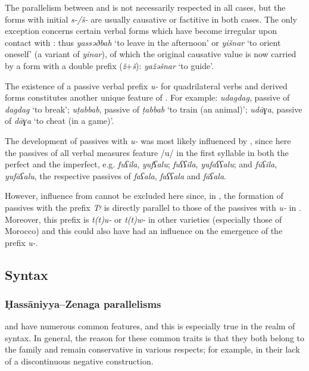 \documentclass[output=paper]{langsci/langscibook}
\begin{document}
The parallelism between  and  is not necessarily respected in all cases, but the forms with initial \textit{s-/š-} are usually {causative} or factitive in both cases. The only exception concerns certain  verbal forms which have become irregular upon contact with : thus \textit{yassəðbah} ‘to leave in the afternoon’ or \textit{yišnar} ‘to orient oneself’ (a variant of \textit{yinar}), of which the original {causative} value is now carried by a form with a double prefix (\textit{ž}+\textit{š}): \textit{yažəšnar} ‘to guide’.


The existence of a {passive} verbal prefix \textit{u-} for quadrilateral verbs and derived forms constitutes another unique feature of . For example: \textit{udagdag}, {passive} of \textit{dagdag} ‘to break’; \textit{uṭabbab}, {passive} of \textit{ṭabbab} ‘to train (an animal)’; \textit{udāɣa}, {passive} of \textit{dāɣa} ‘to cheat (in a game)’.

The development of passives with \textit{u-} was most likely influenced by  , since here the passives of all verbal measures feature /u/ in the first syllable in both the perfect and the imperfect, e.g. \textit{fuʕila}, \textit{yu}\textit{fʕalu}; \textit{fuʕʕila}, \textit{yu}\textit{faʕʕalu}; and \textit{fūʕila}, \textit{yu}\textit{fāʕalu}, the respective passives of \textit{faʕala}, \textit{faʕʕala} and \textit{fāʕala}.

However, influence from  cannot be excluded here since, in , the {formation} of passives with the prefix \textit{Tʸ} is directly parallel to those of the passives with \textit{u-} in . Moreover, this prefix is \textit{t(t)u-} or \textit{t(t)w-} in other  varieties (especially those of Morocco) and this could also have had an influence on the emergence of the prefix \textit{u-}. 

\subsection{Syntax} %

\subsubsection{Ḥassāniyya–Zenaga parallelisms} %

 and  have numerous common features, and this is especially true in the realm of syntax. In general, the reason for these common traits is that they both belong to the  family and remain conservative in various respects; for example, in their lack of a discontinuous negative construction.
\end{document}
